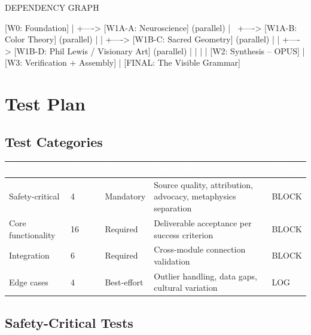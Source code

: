 \documentclass[11pt,letterpaper]{article}
\newcommand{\tableheader}[1]{\textbf{\sffamily\textcolor{white}{#1}}}
\begin{document}
\begin{asciibox}
DEPENDENCY GRAPH

[W0: Foundation]
      |
      +----> [W1A-A: Neuroscience]  (parallel)
      |                   \
      +----> [W1A-B: Color Theory]  (parallel)
      |                   |
      +----> [W1B-C: Sacred Geometry] (parallel)
      |                   |
      +----> [W1B-D: Phil Lewis / Visionary Art] (parallel)
                          |         |
                          |         |
                      [W2: Synthesis -- OPUS]
                              |
                      [W3: Verification + Assembly]
                              |
                     [FINAL: The Visible Grammar]
\end{asciibox}

\newpage

\section{Test Plan}

\subsection{Test Categories}

\begin{center}
\begin{tabularx}{\textwidth}{L{3cm}C{1.5cm}L{2cm}XC{2cm}}
\toprule
{}
\tableheader{Category} & \tableheader{Count} & \tableheader{Priority} & \tableheader{Description} & \tableheader{Failure} \\
\midrule
Safety-critical & 4 & Mandatory & Source quality, attribution, advocacy, metaphysics separation & BLOCK \\
Core functionality & 16 & Required & Deliverable acceptance per success criterion & BLOCK \\
Integration & 6 & Required & Cross-module connection validation & BLOCK \\
Edge cases & 4 & Best-effort & Outlier handling, data gaps, cultural variation & LOG \\
\bottomrule
\end{tabularx}
\end{center}

\subsection{Safety-Critical Tests}
\end{document}
